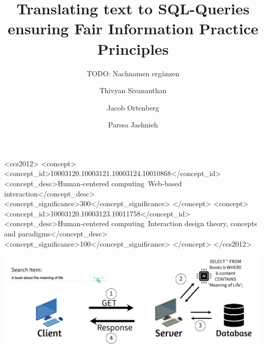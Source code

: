 \documentclass[manuscript,review]{acmart}
\begin{document}
\title{Translating text to SQL-Queries ensuring Fair Information Practice Principles}
\author{TODO: Nachnamen ergänzen}
\author{Thivyan Sivananthan}
\author{Jacob Ortenberg}
\author{Parssa Jashnieh}
\address{Bergische Universität Wuppertal}




\begin{CCSXML}
  <ccs2012>
     <concept>
         <concept_id>10003120.10003121.10003124.10010868</concept_id>
         <concept_desc>Human-centered computing~Web-based interaction</concept_desc>
         <concept_significance>300</concept_significance>
         </concept>
     <concept>
         <concept_id>10003120.10003123.10011758</concept_id>
         <concept_desc>Human-centered computing~Interaction design theory, concepts and paradigms</concept_desc>
         <concept_significance>100</concept_significance>
         </concept>
   </ccs2012>
\end{CCSXML}
  


\maketitle

\includegraphics[width=\textwidth]{images/front_image}
\end{document}
